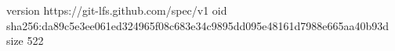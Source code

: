 version https://git-lfs.github.com/spec/v1
oid sha256:da89c5e3ee061ed324965f08c683e34c9895dd095e48161d7988e665aa40b93d
size 522
